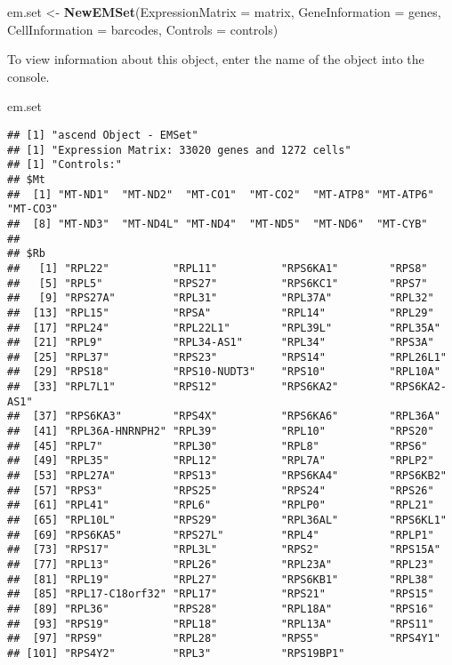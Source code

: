 \documentclass[]{article}
\newenvironment{Shaded}{\begin{snugshade}}{\end{snugshade}}
\newcommand{\DataTypeTok}[1]{\textcolor[rgb]{0.13,0.29,0.53}{#1}}
\newcommand{\KeywordTok}[1]{\textcolor[rgb]{0.13,0.29,0.53}{\textbf{#1}}}
\newcommand{\NormalTok}[1]{#1}
\newcommand{\StringTok}[1]{\textcolor[rgb]{0.31,0.60,0.02}{#1}}
\begin{document}
\begin{Shaded}
\begin{Highlighting}[]
\NormalTok{em.set <-}\StringTok{ }\KeywordTok{NewEMSet}\NormalTok{(}\DataTypeTok{ExpressionMatrix =}\NormalTok{ matrix, }\DataTypeTok{GeneInformation =}\NormalTok{ genes, }
                   \DataTypeTok{CellInformation =}\NormalTok{ barcodes, }\DataTypeTok{Controls =}\NormalTok{ controls)}
\end{Highlighting}
\end{Shaded}

To view information about this object, enter the name of the object into
the console.

\begin{Shaded}
\begin{Highlighting}[]
\NormalTok{em.set}
\end{Highlighting}
\end{Shaded}

\begin{verbatim}
## [1] "ascend Object - EMSet"
## [1] "Expression Matrix: 33020 genes and 1272 cells"
## [1] "Controls:"
## $Mt
##  [1] "MT-ND1"  "MT-ND2"  "MT-CO1"  "MT-CO2"  "MT-ATP8" "MT-ATP6" "MT-CO3" 
##  [8] "MT-ND3"  "MT-ND4L" "MT-ND4"  "MT-ND5"  "MT-ND6"  "MT-CYB" 
## 
## $Rb
##   [1] "RPL22"          "RPL11"          "RPS6KA1"        "RPS8"          
##   [5] "RPL5"           "RPS27"          "RPS6KC1"        "RPS7"          
##   [9] "RPS27A"         "RPL31"          "RPL37A"         "RPL32"         
##  [13] "RPL15"          "RPSA"           "RPL14"          "RPL29"         
##  [17] "RPL24"          "RPL22L1"        "RPL39L"         "RPL35A"        
##  [21] "RPL9"           "RPL34-AS1"      "RPL34"          "RPS3A"         
##  [25] "RPL37"          "RPS23"          "RPS14"          "RPL26L1"       
##  [29] "RPS18"          "RPS10-NUDT3"    "RPS10"          "RPL10A"        
##  [33] "RPL7L1"         "RPS12"          "RPS6KA2"        "RPS6KA2-AS1"   
##  [37] "RPS6KA3"        "RPS4X"          "RPS6KA6"        "RPL36A"        
##  [41] "RPL36A-HNRNPH2" "RPL39"          "RPL10"          "RPS20"         
##  [45] "RPL7"           "RPL30"          "RPL8"           "RPS6"          
##  [49] "RPL35"          "RPL12"          "RPL7A"          "RPLP2"         
##  [53] "RPL27A"         "RPS13"          "RPS6KA4"        "RPS6KB2"       
##  [57] "RPS3"           "RPS25"          "RPS24"          "RPS26"         
##  [61] "RPL41"          "RPL6"           "RPLP0"          "RPL21"         
##  [65] "RPL10L"         "RPS29"          "RPL36AL"        "RPS6KL1"       
##  [69] "RPS6KA5"        "RPS27L"         "RPL4"           "RPLP1"         
##  [73] "RPS17"          "RPL3L"          "RPS2"           "RPS15A"        
##  [77] "RPL13"          "RPL26"          "RPL23A"         "RPL23"         
##  [81] "RPL19"          "RPL27"          "RPS6KB1"        "RPL38"         
##  [85] "RPL17-C18orf32" "RPL17"          "RPS21"          "RPS15"         
##  [89] "RPL36"          "RPS28"          "RPL18A"         "RPS16"         
##  [93] "RPS19"          "RPL18"          "RPL13A"         "RPS11"         
##  [97] "RPS9"           "RPL28"          "RPS5"           "RPS4Y1"        
## [101] "RPS4Y2"         "RPL3"           "RPS19BP1"
\end{verbatim}
\end{document}
